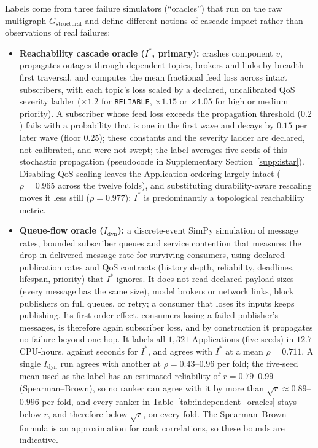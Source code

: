 Labels come from three failure simulators (``oracles'') that run on the raw multigraph $G_{\text{structural}}$ and define different notions of cascade impact rather than observations of real failures:
\begin{itemize}\tightlist
    \item \textbf{Reachability cascade oracle ($I^*$, primary):} crashes component $v$, propagates outages through dependent topics, brokers and links by breadth-first traversal, and computes the mean fractional feed loss across intact subscribers, with each topic's loss scaled by a declared, uncalibrated QoS severity ladder ($\times 1.2$ for \texttt{RELIABLE}, $\times 1.15$ or $\times 1.05$ for high or medium priority). A subscriber whose feed loss exceeds the propagation threshold ($0.2$) fails with a probability that is one in the first wave and decays by $0.15$ per later wave (floor $0.25$); these constants and the severity ladder are declared, not calibrated, and were not swept; the label averages five seeds of this stochastic propagation (pseudocode in Supplementary Section~\ref{supp:istar}). Disabling QoS scaling leaves the Application ordering largely intact ($\rho = 0.965$ across the twelve folds), and substituting durability-aware rescaling moves it less still ($\rho = 0.977$): $I^*$ is predominantly a topological reachability metric.
    \item \textbf{Queue-flow oracle ($I_{\text{dyn}}$):} a discrete-event SimPy \cite{team2020simpy} simulation of message rates, bounded subscriber queues and service contention that measures the drop in delivered message rate for surviving consumers, using declared publication rates and QoS contracts (history depth, reliability, deadlines, lifespan, priority) that $I^*$ ignores. It does not read declared payload sizes (every message has the same size), model brokers or network links, block publishers on full queues, or retry; a consumer that loses its inputs keeps publishing. Its first-order effect, consumers losing a failed publisher's messages, is therefore again subscriber loss, and by construction it propagates no failure beyond one hop. It labels all $1{,}321$ Applications (five seeds) in $12.7$ CPU-hours, against seconds for $I^*$, and agrees with $I^*$ at a mean $\rho = 0.711$. A single $I_{\text{dyn}}$ run agrees with another at $\rho = 0.43$--$0.96$ per fold; the five-seed mean used as the label has an estimated reliability of $r = 0.79$--$0.99$ (Spearman--Brown), so no ranker can agree with it by more than $\sqrt{r} \approx 0.89$--$0.996$ per fold, and every ranker in Table~\ref{tab:independent_oracles} stays below $r$, and therefore below $\sqrt{r}$, on every fold. The Spearman--Brown formula is an approximation for rank correlations, so these bounds are indicative.

\end{itemize}
